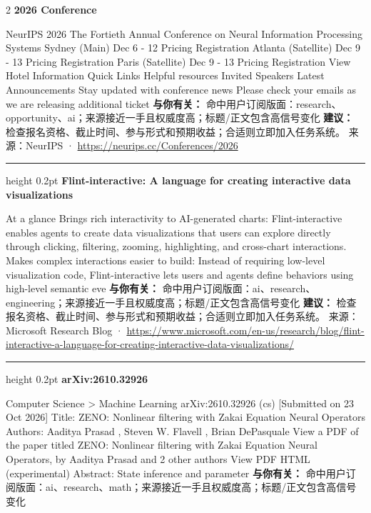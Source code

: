 \documentclass[10.5pt]{ctexart}
\begin{document}
\begin{multicols}{2}
{\large\bfseries 2026 Conference}\par
NeurIPS 2026 The Fortieth Annual Conference on Neural Information Processing Systems Sydney (Main) Dec 6 - 12 Pricing Registration Atlanta (Satellite) Dec 9 - 13 Pricing Registration Paris (Satellite) Dec 9 - 13 Pricing Registration View Hotel Information Quick Links Helpful resources Invited Speakers Latest Announcements Stay updated with conference news Please check your emails as we are releasing additional ticket
\textbf{与你有关：} 命中用户订阅版面：research、opportunity、ai；来源接近一手且权威度高；标题/正文包含高信号变化
\textbf{建议：} 检查报名资格、截止时间、参与形式和预期收益；合适则立即加入任务系统。
{\footnotesize\color{ormuted} 来源：NeurIPS · \url{https://neurips.cc/Conferences/2026}}
\vspace{2mm}
\hrule height 0.2pt
\vspace{2mm}
{\large\bfseries Flint-interactive: A language for creating interactive data visualizations}\par
At a glance Brings rich interactivity to AI-generated charts: Flint-interactive enables agents to create data visualizations that users can explore directly through clicking, filtering, zooming, highlighting, and cross-chart interactions. Makes complex interactions easier to build: Instead of requiring low-level visualization code, Flint-interactive lets users and agents define behaviors using high-level semantic eve
\textbf{与你有关：} 命中用户订阅版面：ai、research、engineering；来源接近一手且权威度高；标题/正文包含高信号变化
\textbf{建议：} 检查报名资格、截止时间、参与形式和预期收益；合适则立即加入任务系统。
{\footnotesize\color{ormuted} 来源：Microsoft Research Blog · \url{https://www.microsoft.com/en-us/research/blog/flint-interactive-a-language-for-creating-interactive-data-visualizations/}}
\vspace{2mm}
\hrule height 0.2pt
\vspace{2mm}
{\large\bfseries arXiv:2610.32926}\par
Computer Science > Machine Learning arXiv:2610.32926 (cs) [Submitted on 23 Oct 2026] Title: ZENO: Nonlinear filtering with Zakai Equation Neural Operators Authors: Aaditya Prasad , Steven W. Flavell , Brian DePasquale View a PDF of the paper titled ZENO: Nonlinear filtering with Zakai Equation Neural Operators, by Aaditya Prasad and 2 other authors View PDF HTML (experimental) Abstract: State inference and parameter 
\textbf{与你有关：} 命中用户订阅版面：ai、research、math；来源接近一手且权威度高；标题/正文包含高信号变化

\end{multicols}
\end{document}
